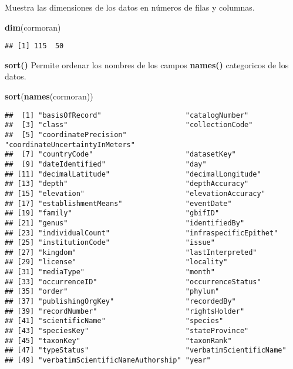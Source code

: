 \documentclass[
]{article}
\newenvironment{Shaded}{\begin{snugshade}}{\end{snugshade}}
\newcommand{\FunctionTok}[1]{\textcolor[rgb]{0.13,0.29,0.53}{\textbf{#1}}}
\newcommand{\NormalTok}[1]{#1}
\begin{document}
Muestra las dimensiones de los datos en números de filas y columnas.

\begin{Shaded}
\begin{Highlighting}[]
\FunctionTok{dim}\NormalTok{(cormoran)}
\end{Highlighting}
\end{Shaded}

\begin{verbatim}
## [1] 115  50
\end{verbatim}

\textbf{sort()} Permite ordenar los nombres de los campos
\textbf{names()} categoricos de los datos.

\begin{Shaded}
\begin{Highlighting}[]
\FunctionTok{sort}\NormalTok{(}\FunctionTok{names}\NormalTok{(cormoran))}
\end{Highlighting}
\end{Shaded}

\begin{verbatim}
##  [1] "basisOfRecord"                    "catalogNumber"                   
##  [3] "class"                            "collectionCode"                  
##  [5] "coordinatePrecision"              "coordinateUncertaintyInMeters"   
##  [7] "countryCode"                      "datasetKey"                      
##  [9] "dateIdentified"                   "day"                             
## [11] "decimalLatitude"                  "decimalLongitude"                
## [13] "depth"                            "depthAccuracy"                   
## [15] "elevation"                        "elevationAccuracy"               
## [17] "establishmentMeans"               "eventDate"                       
## [19] "family"                           "gbifID"                          
## [21] "genus"                            "identifiedBy"                    
## [23] "individualCount"                  "infraspecificEpithet"            
## [25] "institutionCode"                  "issue"                           
## [27] "kingdom"                          "lastInterpreted"                 
## [29] "license"                          "locality"                        
## [31] "mediaType"                        "month"                           
## [33] "occurrenceID"                     "occurrenceStatus"                
## [35] "order"                            "phylum"                          
## [37] "publishingOrgKey"                 "recordedBy"                      
## [39] "recordNumber"                     "rightsHolder"                    
## [41] "scientificName"                   "species"                         
## [43] "speciesKey"                       "stateProvince"                   
## [45] "taxonKey"                         "taxonRank"                       
## [47] "typeStatus"                       "verbatimScientificName"          
## [49] "verbatimScientificNameAuthorship" "year"
\end{verbatim}
\end{document}
